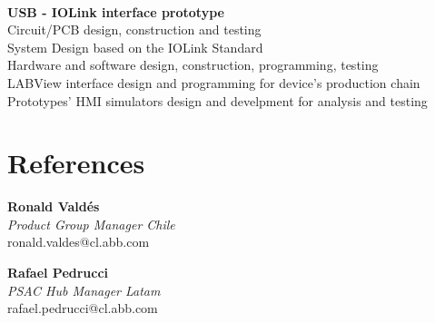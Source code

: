 \documentclass[10pt,letterpaper]{article}
\begin{document}
\begin{minipage}{0.67\textwidth}
\begin{flushright}
\\[1em]\textbf{USB - IOLink interface prototype}
\\Circuit/PCB design, construction and testing
\\System Design based on the IOLink Standard
\\Hardware and software design, construction, programming, testing
\\LABView interface design and programming for device's production chain
\\Prototypes’ HMI simulators design and develpment for analysis and testing
\section*{\color{MidnightBlue} References}	

\begin{minipage}{2.3in}
\begin{flushright}
\textbf{Ronald Vald\'{e}s}
\\\textit{Product Group Manager Chile}
\\ronald.valdes@cl.abb.com
\end{flushright}
\end{minipage}
\begin{minipage}{2.3in}
\begin{flushright}
\textbf{Rafael Pedrucci}
\\\textit{PSAC Hub Manager Latam}
\\rafael.pedrucci@cl.abb.com
\end{flushright}
\end{minipage}
\end{flushright}

\end{minipage}	

	
\end{document}
